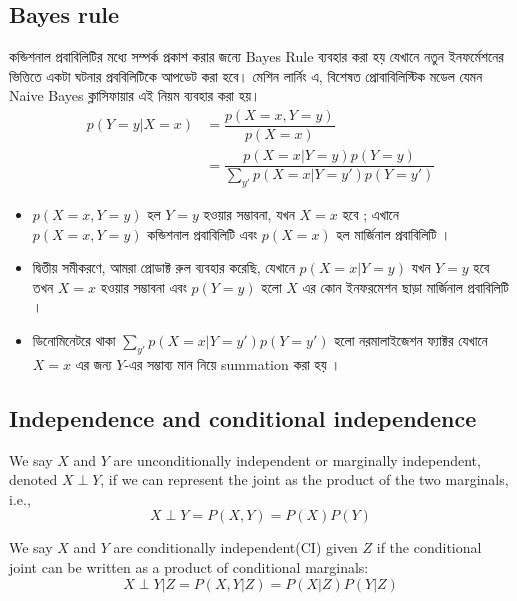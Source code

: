 \documentclass[graybox, envcountchap, twocolumn]{styles/svmult}
\begin{document}
\subsection{Bayes rule}
{\bengalifont কন্ডিশনাল প্রবাবিলিটির মধ্যে সম্পর্ক প্রকাশ করার জন্যে Bayes Rule ব্যবহার করা হয় যেখানে নতুন ইনফর্মেশনের ভিত্তিতে একটা ঘটনার প্রববিলিটিকে আপডেট করা হবে। মেশিন লার্নিং এ, বিশেষত প্রোবাবিলিস্টিক মডেল যেমন Naive Bayes ক্লাসিফায়ার এই নিয়ম ব্যবহার করা হয়। }
\begin{equation}
\begin{split}
p(Y=y|X=x) & =\dfrac{p(X=x,Y=y)}{p(X=x)} \\
           & =\dfrac{p(X=x|Y=y)p(Y=y)}{\sum_{y'}p(X=x|Y=y')p(Y=y')}
\end{split}
\end{equation}
\begin{itemize}
    \item {\bengalifont 
    \(p(X=x, Y=y)\) হল \(Y=y\) হওয়ার সম্ভাবনা, যখন \(X=x\) হবে ; এখানে \(p(X=x, Y=y)\)  কন্ডিশনাল প্রবাবিলিটি  এবং \(p(X=x)\) হল মার্জিনাল প্রবাবিলিটি ।  
    }
    
    \item {\bengalifont 
    দ্বিতীয় সমীকরণে, আমরা প্রোডাক্ট রুল ব্যবহার করেছি, যেখানে \(p(X=x|Y=y)\) যখন  \(Y=y\) হবে তখন \(X=x\) হওয়ার সম্ভাবনা এবং \(p(Y=y)\) হলো $X$ এর কোন ইনফরমেশন ছাড়া  মার্জিনাল প্রবাবিলিটি ।
    }

    \item {\bengalifont 
    ডিনোমিনেটরে থাকা \(\sum_{y'} p(X=x|Y=y') p(Y=y')\) হলো নরমালাইজেশন ফ্যাক্টর যেখানে $X = x$ এর জন্য  \(Y\)-এর সম্ভাব্য মান নিয়ে summation  করা হয় । 
    }
\end{itemize}



\subsection{Independence and conditional independence}
We say $X$ and $Y$ are unconditionally independent or marginally independent, denoted $X \perp Y$, if we can represent the joint as the product of the two marginals, i.e.,
\begin{equation}
X \perp Y=P(X,Y)=P(X)P(Y)
\end{equation}

We say $X$ and $Y$ are conditionally independent(CI) given $Z$ if the conditional joint can be written as a product of conditional marginals:
\begin{equation}
X \perp Y|Z=P(X,Y|Z)=P(X|Z)P(Y|Z)
\end{equation}
\end{document}
